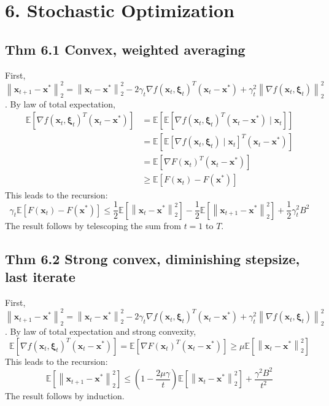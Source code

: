 \section*{6. Stochastic Optimization}
\subsection*{Thm 6.1 Convex, weighted averaging}
First, $\left\|\mathbf{x}_{t+1}-\mathbf{x}^{*}\right\|_{2}^{2}=\left\|\mathbf{x}_{t}-\mathbf{x}^{*}\right\|_{2}^{2}-2 \gamma_{t} \nabla f\left(\mathbf{x}_{t}, \boldsymbol{\xi}_{t}\right)^{T}\left(\mathbf{x}_{t}-\mathbf{x}^{*}\right)+\gamma_{t}^{2}\left\|\nabla f\left(\mathbf{x}_{t}, \boldsymbol{\xi}_{t}\right)\right\|_{2}^{2}$. By law of total expectation,
$$
\begin{aligned}
\mathbb{E}\left[\nabla f\left(\mathbf{x}_{t}, \boldsymbol{\xi}_{t}\right)^{T}\left(\mathbf{x}_{t}-\mathbf{x}^{*}\right)\right] &=\mathbb{E}\left[\mathbb{E}\left[\nabla f\left(\mathbf{x}_{t}, \boldsymbol{\xi}_{t}\right)^{T}\left(\mathbf{x}_{t}-\mathbf{x}^{*}\right) \mid \mathbf{x}_{t}\right]\right] \\
&=\mathbb{E}\left[\mathbb{E}\left[\nabla f\left(\mathbf{x}_{t}, \boldsymbol{\xi}_{t}\right) \mid \mathbf{x}_{t}\right]^{T}\left(\mathbf{x}_{t}-\mathbf{x}^{*}\right)\right] \\
&=\mathbb{E}\left[\nabla F\left(\mathbf{x}_{t}\right)^{T}\left(\mathbf{x}_{t}-\mathbf{x}^{*}\right)\right] \\
& \geq \mathbb{E}\left[F\left(\mathbf{x}_{t}\right)-F\left(\mathbf{x}^{*}\right)\right]
\end{aligned}
$$
This leads to the recursion:
$$
\gamma_{t} \mathbb{E}\left[F\left(\mathbf{x}_{t}\right)-F\left(\mathbf{x}^{*}\right)\right] \leq \frac{1}{2} \mathbb{E}\left[\left\|\mathbf{x}_{t}-\mathbf{x}^{*}\right\|_{2}^{2}\right]-\frac{1}{2} \mathbb{E}\left[\left\|\mathbf{x}_{t+1}-\mathbf{x}^{*}\right\|_{2}^{2}\right]+\frac{1}{2} \gamma_{t}^{2} B^{2}
$$
The result follows by telescoping the sum from $t=1$ to $T$.



\subsection*{Thm 6.2 Strong convex, diminishing stepsize, last iterate}
First, $\left\|\mathbf{x}_{t+1}-\mathbf{x}^{*}\right\|_{2}^{2}=\left\|\mathbf{x}_{t}-\mathbf{x}^{*}\right\|_{2}^{2}-2 \gamma_{t} \nabla f\left(\mathbf{x}_{t}, \boldsymbol{\xi}_{t}\right)^{T}\left(\mathbf{x}_{t}-\mathbf{x}^{*}\right)+\gamma_{t}^{2}\left\|\nabla f\left(\mathbf{x}_{t}, \boldsymbol{\xi}_{t}\right)\right\|_{2}^{2}$.
By law of total expectation and strong convexity,
$$
\mathbb{E}\left[\nabla f\left(\mathbf{x}_{t}, \boldsymbol{\xi}_{t}\right)^{T}\left(\mathbf{x}_{t}-\mathbf{x}^{*}\right)\right]=\mathbb{E}\left[\nabla F\left(\mathbf{x}_{t}\right)^{T}\left(\mathbf{x}_{t}-\mathbf{x}^{*}\right)\right] \geq \mu \mathbb{E}\left[\left\|\mathbf{x}_{t}-\mathbf{x}^{*}\right\|_{2}^{2}\right]
$$
This leads to the recursion:
$$
\mathbb{E}\left[\left\|\mathbf{x}_{t+1}-\mathbf{x}^{*}\right\|_{2}^{2}\right] \leq\left(1-\frac{2 \mu \gamma}{t}\right) \mathbb{E}\left[\left\|\mathbf{x}_{t}-\mathbf{x}^{*}\right\|_{2}^{2}\right]+\frac{\gamma^{2} B^{2}}{t^{2}}
$$
The result follows by induction.